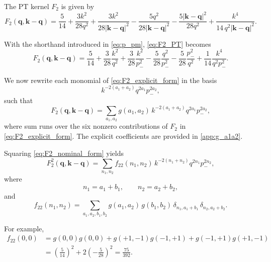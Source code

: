\documentclass[a4paper,11pt]{article}
\newcommand{\<}{\langle}
\renewcommand{\>}{\rangle}
\begin{document}
The PT kernel \(F_2\) is given by
\begin{equation}
F_2(\mathbf q,\mathbf k-\mathbf q)
=
\frac{5}{14}
+\frac{3k^2}{28q^2}
+\frac{3k^2}{28|\mathbf k-\mathbf q|^2}
-\frac{5q^2}{28|\mathbf k-\mathbf q|^2}
-\frac{5|\mathbf k-\mathbf q|^2}{28q^2}
+\frac{k^4}{14\,q^2|\mathbf k-\mathbf q|^2}.
\label{eq:F2_PT}
\end{equation}

With the shorthand introduced in \cref{eq:p_pm}, \cref{eq:F2_PT} becomes
\begin{equation}
F_2(\mathbf q,\mathbf k-\mathbf q)
=
\frac{5}{14}
+\frac{3}{28}\frac{k^2}{q^2}
+\frac{3}{28}\frac{k^2}{p_-^2}
-\frac{5}{28}\frac{q^2}{p_-^2}
-\frac{5}{28}\frac{p_-^2}{q^2}
+\frac{1}{14}\frac{k^4}{q^2 p_-^2}.
\label{eq:F2_explicit_form}
\end{equation}

We now rewrite each monomial of \cref{eq:F2_explicit_form} in the basis
\begin{equation}
k^{-2(a_1+a_2)} q^{2a_1} p_-^{2a_2},
\end{equation}
such that
\begin{equation}
F_2(\mathbf q,\mathbf k-\mathbf q)
=
\sum_{a_1,a_2}
g(a_1,a_2)\,
k^{-2(a_1+a_2)}q^{2a_1}p_-^{2a_2},
\label{eq:F2_nominal_form}
\end{equation}
where sum runs over the six nonzero contributions of \(F_2\) in \cref{eq:F2_explicit_form}.
The explicit coefficients are provided in \cref{app:g_a1a2}.

Squaring \cref{eq:F2_nominal_form} yields
\begin{equation}
F_2^2(\mathbf q,\mathbf k-\mathbf q)
=
\sum_{n_1,n_2} f_{22}(n_1,n_2)\,
k^{-2(n_1+n_2)}q^{2n_1}p_-^{2n_2},
\label{eq:F2square_nominal_form}
\end{equation}
where
\begin{equation}
n_1=a_1+b_1,\qquad n_2=a_2+b_2,
\end{equation}
and
\begin{equation}
f_{22}(n_1,n_2)
=
\sum_{a_1,a_2,b_1,b_2}
g(a_1,a_2)\,g(b_1,b_2)\,
\delta_{n_1,a_1+b_1}\,
\delta_{n_2,a_2+b_2}.
\end{equation}

For example,
\begin{align}
    f_{22}(0,0)
    &=
    g(0,0)g(0,0)
    +g(+1,-1)g(-1,+1)
    +g(-1,+1)g(+1,-1)
    \\
    &=
    \left(\frac{5}{14}\right)^2
    +2\left(-\frac{5}{28}\right)^2
    =
    \frac{75}{392}.
\end{align}
\end{document}

